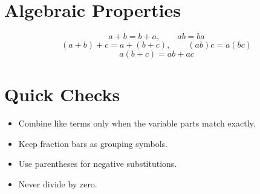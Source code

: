\documentclass[11pt]{article}
\begin{document}
\section*{Algebraic Properties}
\[
a+b=b+a,\qquad ab=ba
\]
\[
(a+b)+c=a+(b+c),\qquad (ab)c=a(bc)
\]
\[
a(b+c)=ab+ac
\]

\section*{Quick Checks}
\begin{itemize}
  \item Combine like terms only when the variable parts match exactly.
  \item Keep fraction bars as grouping symbols.
  \item Use parentheses for negative substitutions.
  \item Never divide by zero.
\end{itemize}
\end{document}
